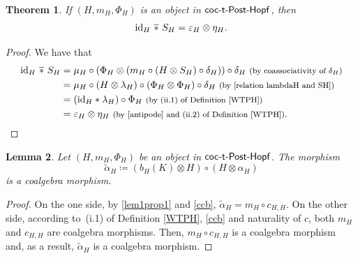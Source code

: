 \documentclass[10pt,a4paper]{amsart}
\numberwithin{equation}{section}
\newtheorem{Theorem}{Theorem}[section]
\newtheorem{Lemma}[Theorem]{Lemma}
 { \theoremstyle{definition}
\newtheorem{Definition}[Theorem]{Definition}
\newtheorem{Example}[Theorem]{Example}
\newtheorem{Remark}[Theorem]{Remark} }
\DeclareMathOperator{\barast}{\,\overline{\ast}\,}
\begin{document}
\begin{Theorem}
If $(H,m_{H},\Phi_{H})$ is an object in $\sf{coc}\textnormal{-}\sf{t}\textnormal{-}\sf{Post}\textnormal{-}\sf{Hopf}$, then
\begin{equation}\label{convolution one side}{\rm id}_{H}\barast S_{H}=\varepsilon_{H}\otimes\eta_{H}.\end{equation}
\end{Theorem}
\begin{proof} We have that
\begin{align*}
{\rm id}_{H}\barast S_{H}={}&\mu_{H}\circ(\Phi_{H}\otimes (m_{H}\circ(H\otimes S_{H})\circ\delta_{H}))\circ\delta_{H}\ \text{\footnotesize\textnormal{(by coassociativity of $\delta_{H}$)}}\\
={}&\mu_{H}\circ(H\otimes \lambda_{H})\circ(\Phi_{H}\otimes\Phi_{H})\circ\delta_{H}\ \text{\footnotesize\textnormal{(by \eqref{relation lambdaH and SH})}}\\
={}&({\rm id}_{H}\ast\lambda_{H})\circ\Phi_{H}\ \text{\footnotesize\textnormal{(by (ii.1) of Definition \ref{WTPH})}}\\
={}&\varepsilon_{H}\otimes\eta_{H}\ \text{\footnotesize\textnormal{(by \eqref{antipode} and (ii.2) of Definition \ref{WTPH})}}.\tag*{\qed}
\end{align*}
\renewcommand{\qed}{}
\end{proof}

\begin{Lemma}
Let $(H,m_{H},\Phi_{H})$ be an object in $\sf{coc}\textnormal{-}\sf{t}\textnormal{-}\sf{Post}\textnormal{-}\sf{Hopf}$. The morphism
\[\tilde{\alpha}_{H}\coloneqq \left( b_{H}(K)\otimes H\right)\circ(H\otimes\alpha_{H})\]
is a coalgebra morphism.
\end{Lemma}
\begin{proof}
On the one side, by \eqref{lem1prop1} and \eqref{ccb}, $\tilde{\alpha}_{H}=m_{H}\circ c_{H,H}$. On the other side, according to~(i.1) of Definition \ref{WTPH}, \eqref{ccb} and naturality of $c$, both $m_{H}$ and $c_{H,H}$ are coalgebra morphisms. Then, $m_{H}\circ c_{H,H}$ is a coalgebra morphism and, as a result, $\tilde{\alpha}_{H}$ is a coalgebra morphism.
\end{proof}
\end{document}
